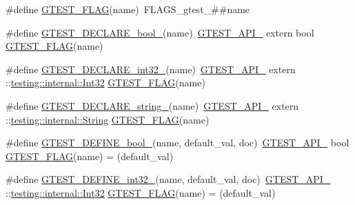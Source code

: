 \begin{DoxyCompactItemize}
\item 
\#define \hyperlink{fused-src_2gtest_2gtest_8h_a828f4e34a1c4b510da50ec1563e3562a}{\-G\-T\-E\-S\-T\-\_\-\-F\-L\-A\-G}(name)~\-F\-L\-A\-G\-S\-\_\-gtest\-\_\-\#\#name
\item 
\#define \hyperlink{fused-src_2gtest_2gtest_8h_a14eb0e9c6e0df765d1fbfd2db6966d14}{\-G\-T\-E\-S\-T\-\_\-\-D\-E\-C\-L\-A\-R\-E\-\_\-bool\-\_\-}(name)~\hyperlink{gtest-port_8h_aa73be6f0ba4a7456180a94904ce17790}{\-G\-T\-E\-S\-T\-\_\-\-A\-P\-I\-\_\-} extern bool \hyperlink{gtest__output__test___8cc_a448e05d56107d7550bea141e0f7a73d3}{\-G\-T\-E\-S\-T\-\_\-\-F\-L\-A\-G}(name)
\item 
\#define \hyperlink{fused-src_2gtest_2gtest_8h_aab2ee98cb616054b1d3a7dc71efe81fc}{\-G\-T\-E\-S\-T\-\_\-\-D\-E\-C\-L\-A\-R\-E\-\_\-int32\-\_\-}(name)~\hyperlink{gtest-port_8h_aa73be6f0ba4a7456180a94904ce17790}{\-G\-T\-E\-S\-T\-\_\-\-A\-P\-I\-\_\-} extern \-::\hyperlink{namespacetesting_1_1internal_a8d84339888eecdb29b3d8f7607af3ecc}{testing\-::internal\-::\-Int32} \hyperlink{gtest__output__test___8cc_a448e05d56107d7550bea141e0f7a73d3}{\-G\-T\-E\-S\-T\-\_\-\-F\-L\-A\-G}(name)
\item 
\#define \hyperlink{fused-src_2gtest_2gtest_8h_a9f74eee05f7ee5534139a622fe7da7dd}{\-G\-T\-E\-S\-T\-\_\-\-D\-E\-C\-L\-A\-R\-E\-\_\-string\-\_\-}(name)~\hyperlink{gtest-port_8h_aa73be6f0ba4a7456180a94904ce17790}{\-G\-T\-E\-S\-T\-\_\-\-A\-P\-I\-\_\-} extern \-::\hyperlink{classtesting_1_1internal_1_1String}{testing\-::internal\-::\-String} \hyperlink{gtest__output__test___8cc_a448e05d56107d7550bea141e0f7a73d3}{\-G\-T\-E\-S\-T\-\_\-\-F\-L\-A\-G}(name)
\item 
\#define \hyperlink{fused-src_2gtest_2gtest_8h_a48e05814779e5a2f432b06a12618a760}{\-G\-T\-E\-S\-T\-\_\-\-D\-E\-F\-I\-N\-E\-\_\-bool\-\_\-}(name, default\-\_\-val, doc)~\hyperlink{gtest-port_8h_aa73be6f0ba4a7456180a94904ce17790}{\-G\-T\-E\-S\-T\-\_\-\-A\-P\-I\-\_\-} bool \hyperlink{gtest__output__test___8cc_a448e05d56107d7550bea141e0f7a73d3}{\-G\-T\-E\-S\-T\-\_\-\-F\-L\-A\-G}(name) = (default\-\_\-val)
\item 
\#define \hyperlink{fused-src_2gtest_2gtest_8h_a88ee2f19589ffff86ca742fd33611358}{\-G\-T\-E\-S\-T\-\_\-\-D\-E\-F\-I\-N\-E\-\_\-int32\-\_\-}(name, default\-\_\-val, doc)~\hyperlink{gtest-port_8h_aa73be6f0ba4a7456180a94904ce17790}{\-G\-T\-E\-S\-T\-\_\-\-A\-P\-I\-\_\-} \-::\hyperlink{namespacetesting_1_1internal_a8d84339888eecdb29b3d8f7607af3ecc}{testing\-::internal\-::\-Int32} \hyperlink{gtest__output__test___8cc_a448e05d56107d7550bea141e0f7a73d3}{\-G\-T\-E\-S\-T\-\_\-\-F\-L\-A\-G}(name) = (default\-\_\-val)

\end{DoxyCompactItemize}
